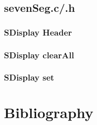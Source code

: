 \documentclass[a4paper,12pt]{article}
\newcommand{\sevenSegC}{../sevenSeg/sevenSeg.c}
\newcommand{\sevenSegH}{../sevenSeg/sevenSeg.h}
\begin{document}
\newpage
\subsection{sevenSeg.c/.h}
\subsubsection{SDisplay Header}

\subsubsection{SDisplay clearAll}

\subsubsection{SDisplay set}

\newpage
\section{Bibliography}
\end{document}
